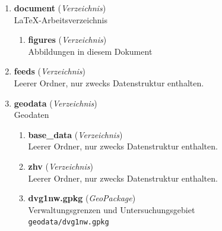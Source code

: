 \begin{enumerate}[label=B\arabic*, ref=B\arabic*, leftmargin=*, itemsep=0.5em, topsep=0.3em]
\begin{enumerate}[label=B\arabic{enumi}-\arabic*, ref=B\arabic{enumi}-\arabic*, leftmargin=*, itemsep=0.5em, topsep=0.3em]
\texttt{\small code/tags\_filter.cmd}
\edef\appendixlabelkey{app:B\arabic{enumi}-\arabic{enumii}}
\expandafter\label\expandafter{\appendixlabelkey}
\end{enumerate}
\item \textbf{document} \textnormal{(\textit{Verzeichnis})}\\
\LaTeX-Arbeitsverzeichnis
\edef\appendixlabelkey{app:B\arabic{enumi}}
\expandafter\label\expandafter{\appendixlabelkey}
\begin{enumerate}[label=B\arabic{enumi}-\arabic*, ref=B\arabic{enumi}-\arabic*, leftmargin=*, itemsep=0.5em, topsep=0.3em]
\item \textbf{figures} \textnormal{(\textit{Verzeichnis})}\\
Abbildungen in diesem Dokument
\edef\appendixlabelkey{app:B\arabic{enumi}-\arabic{enumii}}
\expandafter\label\expandafter{\appendixlabelkey}
\end{enumerate}
\item \textbf{feeds} \textnormal{(\textit{Verzeichnis})}\\
Leerer Ordner, nur zwecks Datenstruktur enthalten.
\edef\appendixlabelkey{app:B\arabic{enumi}}
\expandafter\label\expandafter{\appendixlabelkey}
\item \textbf{geodata} \textnormal{(\textit{Verzeichnis})}\\
Geodaten
\edef\appendixlabelkey{app:B\arabic{enumi}}
\expandafter\label\expandafter{\appendixlabelkey}
\begin{enumerate}[label=B\arabic{enumi}-\arabic*, ref=B\arabic{enumi}-\arabic*, leftmargin=*, itemsep=0.5em, topsep=0.3em]
\item \textbf{base\_data} \textnormal{(\textit{Verzeichnis})}\\
Leerer Ordner, nur zwecks Datenstruktur enthalten.
\edef\appendixlabelkey{app:B\arabic{enumi}-\arabic{enumii}}
\expandafter\label\expandafter{\appendixlabelkey}
\item \textbf{zhv} \textnormal{(\textit{Verzeichnis})}\\
Leerer Ordner, nur zwecks Datenstruktur enthalten.
\edef\appendixlabelkey{app:B\arabic{enumi}-\arabic{enumii}}
\expandafter\label\expandafter{\appendixlabelkey}
\item \textbf{dvg1nw.gpkg} \textnormal{(\textit{GeoPackage})}\\
Verwaltungsgrenzen und Untersuchungsgebiet\\
\texttt{\small geodata/dvg1nw.gpkg}
\edef\appendixlabelkey{app:B\arabic{enumi}-\arabic{enumii}}
\expandafter\label\expandafter{\appendixlabelkey}

\end{enumerate}
\end{enumerate}
